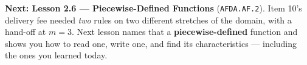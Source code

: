 \documentclass[10pt]{article}
\begin{document}
\vspace{0.10in}

\begin{remindbox}
\small
\textbf{Next: Lesson 2.6 --- Piecewise-Defined Functions} (\texttt{AFDA.AF.2}). Item 10's delivery fee
needed \emph{two} rules on two different stretches of the domain, with a hand-off at $m=3$. Next
lesson names that a \textbf{piecewise-defined} function and shows you how to read one, write one, and
find its characteristics --- including the ones you learned today.
\end{remindbox}
\end{document}
